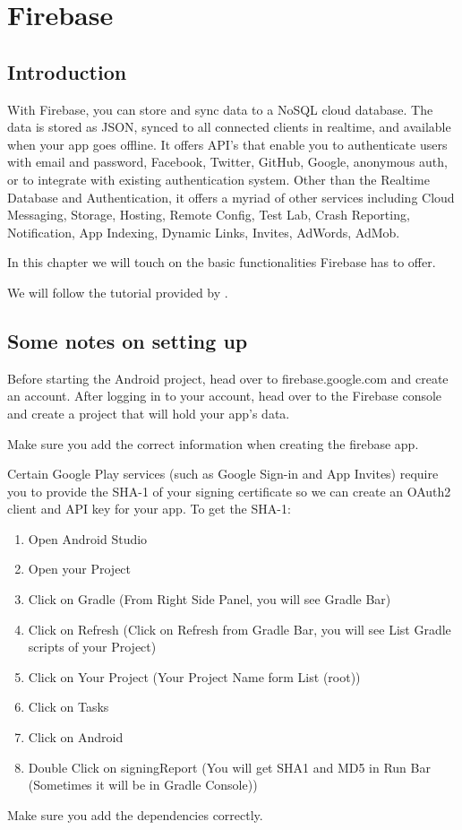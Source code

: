 
\chapter{Firebase}

\section{Introduction}
With Firebase, you can store and sync data to a NoSQL cloud database. The data is stored as JSON, synced to all connected clients in realtime, and available when your app goes offline. It offers API's that enable you to authenticate users with email and password, Facebook, Twitter, GitHub, Google, anonymous auth, or to integrate with existing authentication system. Other than the Realtime Database and Authentication, it offers a myriad of other services including Cloud Messaging, Storage, Hosting, Remote Config, Test Lab, Crash Reporting, Notification, App Indexing, Dynamic Links, Invites, AdWords, AdMob.

In this chapter we will touch on the basic functionalities Firebase has to offer.

We will follow the tutorial provided by \cite{Developpers}.

\section{Some notes on setting up}
Before starting the Android project, head over to firebase.google.com and create an account. After logging in to your account, head over to the Firebase console and create a project that will hold your app’s data.

Make sure you add the correct information when creating the firebase app. 

Certain Google Play services (such as Google Sign-in and App Invites) require you to provide the SHA-1 of your signing certificate so we can create an OAuth2 client and API key for your app. To get the SHA-1:

\begin{enumerate}
	\item Open Android Studio
	\item Open your Project
	\item Click on Gradle (From Right Side Panel, you will see Gradle Bar)
	\item Click on Refresh (Click on Refresh from Gradle Bar, you will see List Gradle scripts of your Project)
	\item Click on Your Project (Your Project Name form List (root))
	\item Click on Tasks
	\item Click on Android
	\item Double Click on signingReport (You will get SHA1 and MD5 in Run Bar (Sometimes it will be in Gradle Console))
\end{enumerate}

Make sure you add the dependencies correctly.




